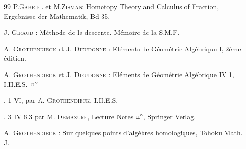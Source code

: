 \documentclass[10pt]{../fichiers-configuration-latex/smfart}
\begin{document}
\begin{thebibliography}{99}\pageoriginale
{} P.\textsc{Gabriel} et M.\textsc{Zisman}: Homotopy Theory
  and Calculus   of Fraction, Ergebnisse der Mathematik, Bd 35.

 J. \textsc{Giraud} : Méthode de la descente. Mémoire de la S.M.F.

 A. \textsc{Grothendieck} et J. \textsc{Dieudonne} : Eléments de
  Géométrie Algébrique I, 2ème édition.

 A. \textsc{Grothendieck} et J. \textsc{Dieudonne} : Eléments de
  Géométrie Algébrique IV 1, I.H.E.S.~${\rm n^{\circ}}$

 \SGA. 1 VI, par A. \textsc{Grothendieck}, I.H.E.S.

 \SGA. 3 IV 6.3 par M. \textsc{Demazure}, Lecture Notes
  ${\rm n^{\circ}}$, Springer Verlag.

 A. \textsc{Grothendieck} : Sur quelques points d'algèbres
  homologiques, Tohoku Math. J.
\end{thebibliography}

\ifx\danslelivre\undefined
\end{document}
